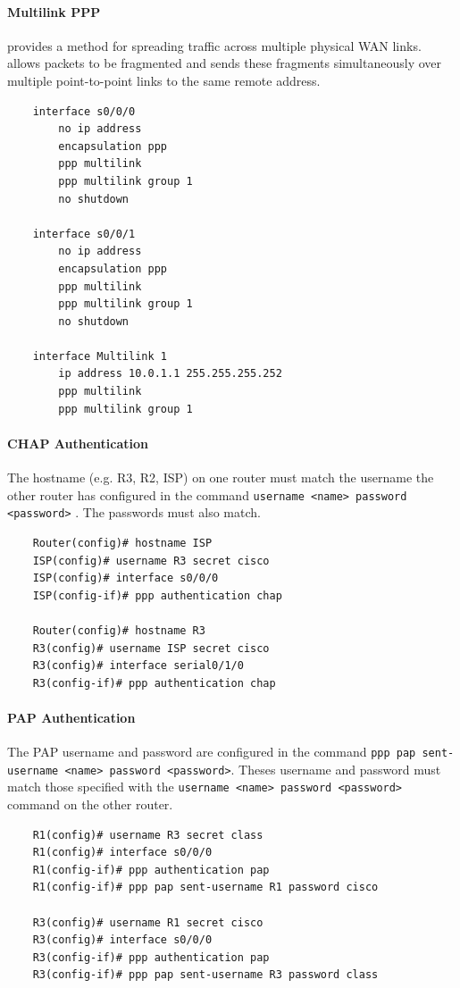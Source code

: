 \paragraph{Multilink PPP} provides a method for spreading traffic across multiple physical WAN links. allows packets to be fragmented and sends these fragments simultaneously over multiple point-to-point links to the same remote address. 
	\begin{verbatim}
	interface s0/0/0
		no ip address
		encapsulation ppp
		ppp multilink	
		ppp multilink group 1
		no shutdown
		
	interface s0/0/1
		no ip address
		encapsulation ppp
		ppp multilink	
		ppp multilink group 1
		no shutdown
		
	interface Multilink 1
		ip address 10.0.1.1 255.255.255.252
		ppp multilink	
		ppp multilink group 1			
	\end{verbatim}
	
\paragraph{CHAP Authentication} The hostname (e.g. R3, R2, ISP) on one router must match the username the other router has configured in the command \verb|username <name> password <password>| . The passwords must also match.
	\begin{verbatim}
	Router(config)# hostname ISP
	ISP(config)# username R3 secret cisco
	ISP(config)# interface s0/0/0
	ISP(config-if)# ppp authentication chap
	
	Router(config)# hostname R3
	R3(config)# username ISP secret cisco
	R3(config)# interface serial0/1/0
	R3(config-if)# ppp authentication chap	
	\end{verbatim}
	
\paragraph{PAP Authentication} The PAP username and password are configured in the command \verb|ppp pap sent-username <name> password <password>|. Theses username and password must match those specified with the \verb|username <name> password <password>| command on the other router.
	\begin{verbatim}
	R1(config)# username R3 secret class
	R1(config)# interface s0/0/0
	R1(config-if)# ppp authentication pap
	R1(config-if)# ppp pap sent-username R1 password cisco
	
	R3(config)# username R1 secret cisco
	R3(config)# interface s0/0/0
	R3(config-if)# ppp authentication pap
	R3(config-if)# ppp pap sent-username R3 password class	
	\end{verbatim}